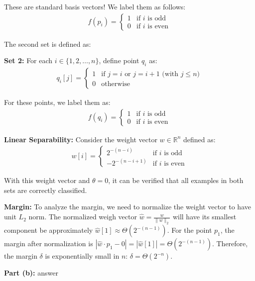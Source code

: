 \documentclass[11pt]{article}
\DeclareMathOperator{\1}{\mathbbm{1}}
\begin{document}
\begin{problem}[15 points]
These are standard basis vectors! We label them as follows:
\begin{align}
	f(p_i) = 
	\begin{cases}
	1 & \text{if } i \text{ is odd} \\
	0 & \text{if } i \text{ is even}
	\end{cases}
	\end{align}


The second set is defined as:

\textbf{Set 2:} For each $i \in \{1, 2, \ldots, n\}$, define point $q_i$ as:
\begin{align}
q_i[j] = 
\begin{cases}
1 & \text{if } j = i \text{ or } j = i+1 \text{ (with } j \leq n\text{)} \\
0 & \text{otherwise}
\end{cases}
\end{align}

For these points, we label them as:
\begin{align}
	f(q_i) = 
	\begin{cases}
	1 & \text{if } i \text{ is odd} \\
	0 & \text{if } i \text{ is even}
	\end{cases}
	\end{align}

\textbf{Linear Separability:} Consider the weight vector $w \in \mathbb{R}^n$ defined as:
\begin{align}
	w[i] = 
	\begin{cases}
	2^{-(n-i)} & \text{if } i \text{ is odd} \\
	-2^{-(n-i+1)} & \text{if } i \text{ is even}
	\end{cases}
	\end{align}

With this weight vector and $\theta=0$, it can be verified that all examples in both sets are correctly classified.

\textbf{Margin:} To analyze the margin, we need to normalize the weight vector to have unit $L_2$ norm. The normalized weigh vector $\hat{w} = \frac{w}{\|w\|_2}$ will have its smallest component be approximately $\hat{w}[1] \approx \Theta(2^{-(n-1)})$. For the point $p_1$, the margin after normalization is $|\hat{w} \cdot p_1 - 0| = |\hat{w}[1]| = \Theta(2^{-(n-1)})$. Therefore, the margin $\delta$ is exponentially small in $n$: $\delta = \Theta(2^{-n})$.

\textbf{Part (b):} answer
\end{problem}
\end{document}
